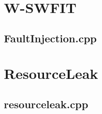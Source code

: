 
\chapter{W-SWFIT}
\section{FaultInjection.cpp} \label{app:w-swfit}


\chapter{ResourceLeak}
\section{resourceleak.cpp} \label{app:resourceLeak}

